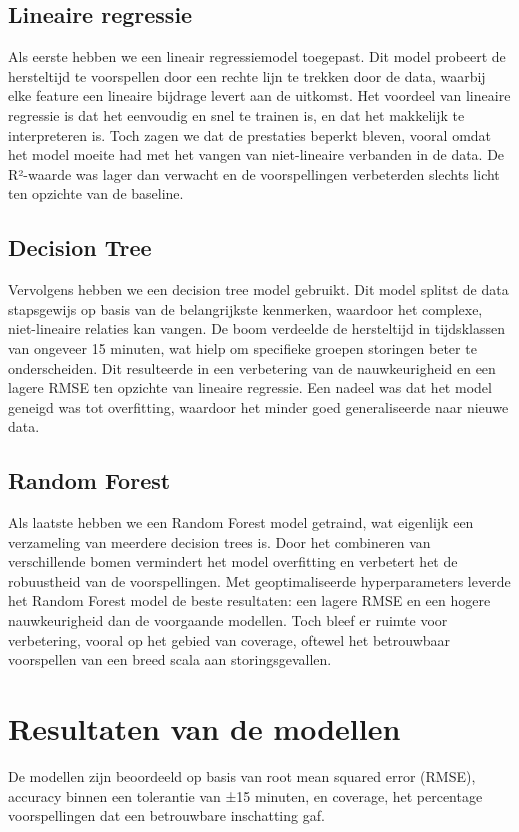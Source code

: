 \documentclass{article}
\begin{document}
\subsection{Lineaire regressie}
Als eerste hebben we een lineair regressiemodel toegepast. Dit model probeert de hersteltijd te voorspellen door een rechte lijn te trekken door de data, waarbij elke feature een lineaire bijdrage levert aan de uitkomst. Het voordeel van lineaire regressie is dat het eenvoudig en snel te trainen is, en dat het makkelijk te interpreteren is. Toch zagen we dat de prestaties beperkt bleven, vooral omdat het model moeite had met het vangen van niet-lineaire verbanden in de data. De R²-waarde was lager dan verwacht en de voorspellingen verbeterden slechts licht ten opzichte van de baseline.

\subsection{Decision Tree}
Vervolgens hebben we een decision tree model gebruikt. Dit model splitst de data stapsgewijs op basis van de belangrijkste kenmerken, waardoor het complexe, niet-lineaire relaties kan vangen. De boom verdeelde de hersteltijd in tijdsklassen van ongeveer 15 minuten, wat hielp om specifieke groepen storingen beter te onderscheiden. Dit resulteerde in een verbetering van de nauwkeurigheid en een lagere RMSE ten opzichte van lineaire regressie. Een nadeel was dat het model geneigd was tot overfitting, waardoor het minder goed generaliseerde naar nieuwe data.

\subsection{Random Forest}
Als laatste hebben we een Random Forest model getraind, wat eigenlijk een verzameling van meerdere decision trees is. Door het combineren van verschillende bomen vermindert het model overfitting en verbetert het de robuustheid van de voorspellingen. Met geoptimaliseerde hyperparameters leverde het Random Forest model de beste resultaten: een lagere RMSE en een hogere nauwkeurigheid dan de voorgaande modellen. Toch bleef er ruimte voor verbetering, vooral op het gebied van coverage, oftewel het betrouwbaar voorspellen van een breed scala aan storingsgevallen.

\section{Resultaten van de modellen}
De modellen zijn beoordeeld op basis van root mean squared error (RMSE), accuracy binnen een tolerantie van ±15 minuten, en coverage, het percentage voorspellingen dat een betrouwbare inschatting gaf.
\end{document}
